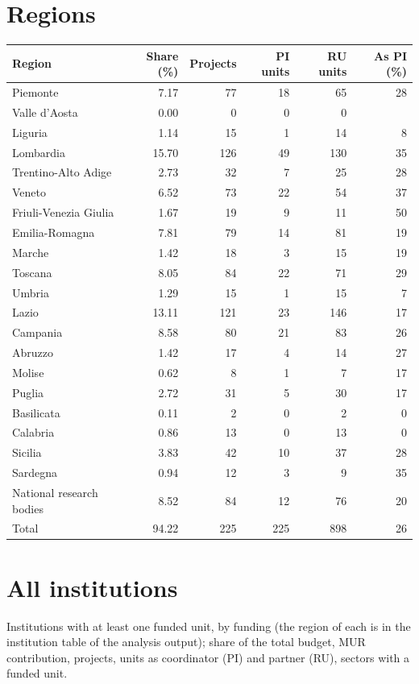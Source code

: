 \documentclass[11pt,a4paper]{article}
\begin{document}
\section{Regions}
\begin{table}[H]
\centering
\footnotesize
\begin{tabular}{lrrrrr}
\toprule
Region & Share (\%) & Projects & PI units & RU units & As PI (\%) \\
\midrule
Piemonte & 7.17 & 77 & 18 & 65 & 28 \\
Valle d'Aosta & 0.00 & 0 & 0 & 0 &  \\
Liguria & 1.14 & 15 & 1 & 14 & 8 \\
Lombardia & 15.70 & 126 & 49 & 130 & 35 \\
Trentino-Alto Adige & 2.73 & 32 & 7 & 25 & 28 \\
Veneto & 6.52 & 73 & 22 & 54 & 37 \\
Friuli-Venezia Giulia & 1.67 & 19 & 9 & 11 & 50 \\
Emilia-Romagna & 7.81 & 79 & 14 & 81 & 19 \\
Marche & 1.42 & 18 & 3 & 15 & 19 \\
Toscana & 8.05 & 84 & 22 & 71 & 29 \\
Umbria & 1.29 & 15 & 1 & 15 & 7 \\
Lazio & 13.11 & 121 & 23 & 146 & 17 \\
Campania & 8.58 & 80 & 21 & 83 & 26 \\
Abruzzo & 1.42 & 17 & 4 & 14 & 27 \\
Molise & 0.62 & 8 & 1 & 7 & 17 \\
Puglia & 2.72 & 31 & 5 & 30 & 17 \\
Basilicata & 0.11 & 2 & 0 & 2 & 0 \\
Calabria & 0.86 & 13 & 0 & 13 & 0 \\
Sicilia & 3.83 & 42 & 10 & 37 & 28 \\
Sardegna & 0.94 & 12 & 3 & 9 & 35 \\
National research bodies & 8.52 & 84 & 12 & 76 & 20 \\
\midrule
Total & 94.22 & 225 & 225 & 898 & 26 \\
\bottomrule
\end{tabular}
\end{table}
\section{All institutions}
Institutions with at least one funded unit, by funding (the region of each is in the institution table of the analysis output); share of the total budget, MUR contribution, projects, units as coordinator (PI) and partner (RU), sectors with a funded unit.
\end{document}
